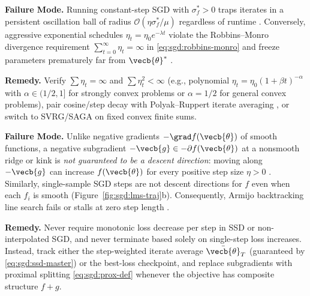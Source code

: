 \documentclass[../../../../master.tex]{subfiles}
\begin{document}
\begin{pitfall}
\textbf{Failure Mode.} Running constant-step SGD with $\sigma_f^* > 0$ traps iterates in a persistent oscillation ball of radius $\mathcal{O}(\eta \sigma_f^* / \mu)$ regardless of runtime  . Conversely, aggressive exponential schedules $\eta_t = \eta_0 e^{-\lambda t}$ violate the Robbins--Monro divergence requirement $\sum_{t=0}^{\infty}\eta_t = \infty$ in \eqref{eq:sgd:robbins-monro} and freeze parameters prematurely far from $\vecb{\theta}^*$ .

\textbf{Remedy.} Verify $\sum \eta_t = \infty$ and $\sum \eta_t^2 < \infty$ (e.g., polynomial $\eta_t = \eta_0 (1 + \beta t)^{-\alpha}$ with $\alpha \in (1/2, 1]$ for strongly convex problems or $\alpha = 1/2$ for general convex problems), pair cosine/step decay with Polyak--Ruppert iterate averaging , or switch to SVRG/SAGA on fixed convex finite sums.
\end{pitfall}

\begin{pitfall}
\textbf{Failure Mode.} Unlike negative gradients $-\grad f(\vecb{\theta})$ of smooth functions, a negative subgradient $-\vecb{g} \in -\partial f(\vecb{\theta})$ at a nonsmooth ridge or kink is \emph{not guaranteed to be a descent direction}: moving along $-\vecb{g}$ can increase $f(\vecb{\theta})$ for every positive step size $\eta > 0$  . Similarly, single-sample SGD steps are not descent directions for $f$ even when each $f_i$ is smooth (Figure~\ref{fig:sgd:lms-traj}b). Consequently, Armijo backtracking line search fails or stalls at zero step length .

\textbf{Remedy.} Never require monotonic loss decrease per step in SSD or non-interpolated SGD, and never terminate based solely on single-step loss increases. Instead, track either the step-weighted iterate average $\bar{\vecb{\theta}}_T$ (guaranteed by \eqref{eq:sgd:ssd-master}) or the best-loss checkpoint, and replace subgradients with proximal splitting \eqref{eq:sgd:prox-def} whenever the objective has composite structure $f + g$.
\end{pitfall}
\end{document}
